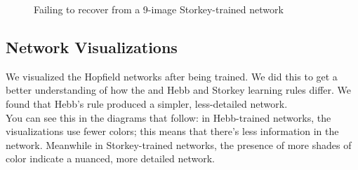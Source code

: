 \documentclass[11pt]{article}
\begin{document}
\begin{figure}[h!]
	\centering
	\qquad
	\caption{Failing to recover from a 9-image Storkey-trained network}
\end{figure}

\pagebreak

\subsection{Network Visualizations}\label{network-visualizations}

We visualized the Hopfield networks after being trained. We did this to
get a better understanding of how the and Hebb and Storkey learning
rules differ. We found that Hebb's rule produced a simpler,
less-detailed network.
\\

You can see this in the diagrams that follow: in Hebb-trained networks,
the visualizations use fewer colors; this means that there's less
information in the network. Meanwhile in Storkey-trained networks, the
presence of more shades of color indicate a nuanced, more detailed
network.
\\
\end{document}
